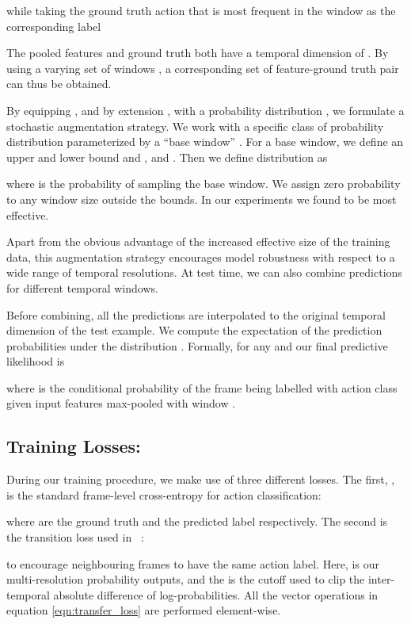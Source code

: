 \documentclass[10pt,twocolumn,letterpaper]{article}
\begin{document}
\noindent while taking the ground truth action that is most frequent in the window  as the corresponding label


\noindent The pooled features  and ground truth  both have a temporal dimension of . By using a varying set of windows , a corresponding set of feature-ground truth pair  can thus be obtained. 

By equipping , and by extension , with a probability distribution , we formulate a stochastic augmentation strategy. We work with a specific class of probability distribution  parameterized by a ``base window'' . For a base window, we define an upper and lower bound  and , and . Then we define distribution  as

where  is the probability of sampling the base window. We assign zero probability to any window size outside the bounds. In our experiments we found  to be most effective.

Apart from the obvious advantage of the increased effective size of the training data, this augmentation strategy encourages model robustness with respect to a wide range of temporal resolutions.  At test time, we can also combine predictions for different temporal windows.  

Before combining, all the predictions are interpolated to the original temporal dimension  of the test example.  We compute the expectation of the prediction probabilities under the distribution . Formally, for any  and  our final predictive likelihood is 

where  is the conditional probability of the frame  being labelled with action class  given input features  max-pooled with window . 

\subsection{Training Losses:}\label{sec:losses}
During our training procedure, we make use of three different losses. 
The first, , is the standard frame-level cross-entropy for action classification:

where  are the ground truth and the predicted label respectively. The second is the transition loss used in~\cite{farha2019ms, li2020ms} :

to encourage neighbouring frames to have the same action label. Here,   is our multi-resolution probability outputs, and the  is the cutoff 
used to clip the inter-temporal absolute difference of log-probabilities. All the vector operations in equation \ref{eqn:transfer_loss} are performed element-wise.
\end{document}
